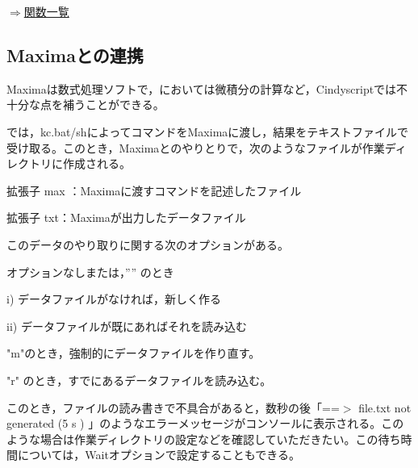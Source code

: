 \documentclass[papersize,a4paper,12pt,uplatex]{jsarticle}
\begin{document}
\begin{flushright}\hyperlink{functionlist}{$\Rightarrow$関数一覧}\end{flushright}
\vspace{\baselineskip}

\subsection{Maximaとの連携}
Maximaは数式処理ソフトで，\ketcindy においては微積分の計算など，Cindyscriptでは不十分な点を補うことができる。

\ketcindy では，kc.bat/shによってコマンドをMaximaに渡し，結果をテキストファイルで受け取る。このとき，Maximaとのやりとりで，次のようなファイルが作業ディレクトリに作成される。

拡張子 max ：Maximaに渡すコマンドを記述したファイル

拡張子 txt：Maximaが出力したデータファイル

このデータのやり取りに関する次のオプションがある。

オプションなしまたは，”” のとき

i) データファイルがなければ，新しく作る

ii) データファイルが既にあればそれを読み込む

"m"のとき，強制的にデータファイルを作り直す。

"r" のとき，すでにあるデータファイルを読み込む。

このとき，ファイルの読み書きで不具合があると，数秒の後「==$>$ file.txt not generated (5 s ) 」のようなエラーメッセージがコンソールに表示される。このような場合は作業ディレクトリの設定などを確認していただきたい。この待ち時間については，Waitオプションで設定することもできる。
\end{document}
